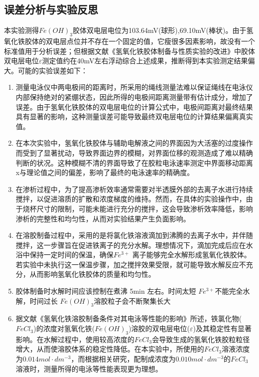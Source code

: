 \documentclass[12pt,hyperref,a4paper,UTF8]{ctexart}
\begin{document}
\subsection{误差分析与实验反思}
本实验测得$Fe(OH)_3$胶体双电层电位为103.64mV(球形),69.10mV(棒状)。由于氢氧化铁胶体的双电层点位并不存在一个固定的值，它瘦很多因素影响，故没有一个标准值用于分析误差；但根据文献《氢氧化铁胶体制备与性质实验的改进》\cite{3}中胶体双电层电位$\varepsilon$测定值约在40mV左右浮动综合上述成果，推断得到本实验测定结果偏大。可能的实验误差如下：
\begin{enumerate}
    \item 测量电泳仪中两电极间的距离时，所采用的绳线测量法难以保证绳线在电泳仪内部保持绝对的紧绷状态，因此所得的电极间距离测量带有估计成分，增加了误差。由于氢氧化铁胶体的双电层电位的计算公式中，电极间距离对最终结果具有显著的影响，这种测量误差可能导致最终双电层电位的计算结果偏离真实值。
    \item 在本次实验中，氢氧化铁胶体与辅助电解液之间的界面因为大活塞的过度操作而受到了显著扰动，导致界面边界的模糊，对界面位移的观测造成了难以精确判断的状况。这种模糊不清的界面导致了在胶粒电泳速率测定中界面移动距离x与理论值之间的偏差，影响了最终的电泳速率的精确度。
    \item 在渗析过程中，为了提高渗析效率通常需要对半透膜外部的去离子水进行持续搅拌，以促进溶质的扩散和浓度梯度的维持。然而，在具体的实验操作中，由于烧杯尺寸的限制，可能未能进行充分的搅拌，这会导致渗析效率降低，影响渗析的完整性和均匀性，从而对实验结果产生负面影响。
    \item 在溶胶制备过程中，采用的是将氯化铁溶液滴加到沸腾的去离子水中，并伴随搅拌，这一步骤旨在促进铁离子的充分水解。理想情况下，滴加完成后应在水浴中保持一定时间的保温，确保$Fe^{3+}$ 离子能够完全水解形成氢氧化铁胶体。若实验中未执行这一保温步骤，加之搅拌效果受限，就可能导致水解反应不充分，从而影响氢氧化铁胶体的质量和均匀性。
    \item 胶体制备时水解时间应该控制在煮沸 5min 左右。时间太短 $Fe^{3+}$不能完全水解，时间过长 $Fe(OH)_3$溶胶粒子会不断聚集长大
    \item 据文献《氢氧化铁溶胶制备条件对其电泳等性能的影响》\cite{4}所述，铁氯化物($FeCl_3$)的浓度对氢氧化铁($Fe(OH)_3$)溶胶的双电层电位($\varepsilon$)及其稳定性有显著影响。在水解过程中，使用较高浓度的$FeCl_3$会导致生成的氢氧化铁胶粒粒径增大，从而使溶胶体系的稳定性降低。在本实验中，所使用的$FeCl_3$溶液浓度为$0.014mol\cdot dm^{-3}$，而根据相关研究，配制成浓度为$0.010mol\cdot dm^{-3}$的$FeCl_3$溶液时，测量所得的电泳等性能表现更为理想。
\end{enumerate}
\end{document}
